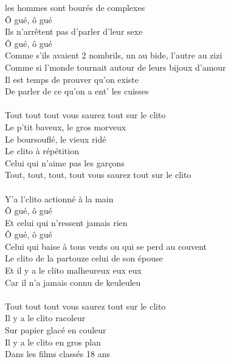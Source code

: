 
 les hommes sont bourés de complexes
\\Ô gué, ô gué
\\Ils n'arrêtent pas d'parler d'leur sexe 
\\Ô gué, ô gué
\\Comme s'ils avaient 2 nombrils, un au bide, l'autre au zizi
\\Comme si l'monde tournait autour de leurs bijoux d'amour
\\Il est temps de prouver qu'on existe
\\De parler de ce qu'on a ent' les cuisses
\\\\Tout tout tout vous saurez tout sur le clito
\\Le p'tit baveux, le gros morveux
\\Le boursouflé, le vieux ridé
\\Le clito à répétition
\\Celui qui n'aime pas les garçons
\\Tout, tout, tout, tout vous saurez tout sur le clito
\\\\Y'a l'clito actionné à la main 
\\Ô gué, ô gué
\\Et celui qui n'ressent jamais rien 
\\Ô gué, ô gué
\\Celui qui baise à tous vents ou qui se perd au couvent
\\Le clito de la partouze celui de son épouse
\\Et il y a le clito malheureux eux eux
\\Car il n'a jamais connu de keuleuleu
\\\\Tout tout tout vous saurez tout sur le clito
\\Il y a le clito racoleur
\\Sur papier glacé en couleur
\\Il y a le clito en gros plan
\\Dans les films classés 18 ans
